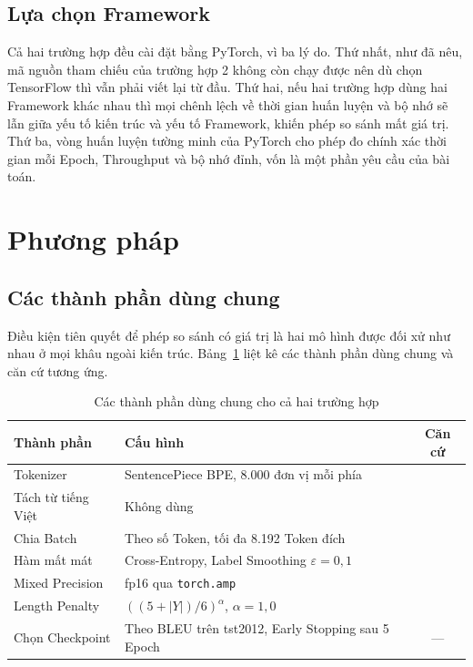 \documentclass[11pt,a4paper]{article}
\newcommand{\file}[1]{\texttt{\small #1}}
\begin{document}
\subsection{Lựa chọn Framework}

Cả hai trường hợp đều cài đặt bằng PyTorch, vì ba lý do. Thứ nhất, như đã nêu,
mã nguồn tham chiếu của trường hợp 2 không còn chạy được nên dù chọn TensorFlow
thì vẫn phải viết lại từ đầu. Thứ hai, nếu hai trường hợp dùng hai Framework
khác nhau thì mọi chênh lệch về thời gian huấn luyện và bộ nhớ sẽ lẫn giữa yếu
tố kiến trúc và yếu tố Framework, khiến phép so sánh mất giá trị. Thứ ba, vòng
huấn luyện tường minh của PyTorch cho phép đo chính xác thời gian mỗi Epoch,
Throughput và bộ nhớ đỉnh, vốn là một phần yêu cầu của bài toán.

\section{Phương pháp}
\label{sec:phuongphap}

\subsection{Các thành phần dùng chung}

Điều kiện tiên quyết để phép so sánh có giá trị là hai mô hình được đối xử như
nhau ở mọi khâu ngoài kiến trúc. Bảng~\ref{tab:shared} liệt kê các thành phần
dùng chung và căn cứ tương ứng.

\begin{table}[H]
\centering
\small
\caption{Các thành phần dùng chung cho cả hai trường hợp}
\label{tab:shared}
\begin{tabularx}{\textwidth}{lXc}
\toprule
\textbf{Thành phần} & \textbf{Cấu hình} & \textbf{Căn cứ} \\
\midrule
Tokenizer & SentencePiece BPE, 8.000 đơn vị mỗi phía & \cite{sennrich2016} \\
Tách từ tiếng Việt & Không dùng & \cite{phanvu2017,phanvu2019} \\
Chia Batch & Theo số Token, tối đa 8.192 Token đích & \cite{ott2018} \\
Hàm mất mát & Cross-Entropy, Label Smoothing $\varepsilon = 0{,}1$ & \cite{vaswani2017} \\
Mixed Precision & fp16 qua \file{torch.amp} & \cite{ott2018} \\
Length Penalty & $((5+|Y|)/6)^{\alpha}$, $\alpha = 1{,}0$ & \cite{wu2016} \\
Chọn Checkpoint & Theo BLEU trên tst2012, Early Stopping sau 5 Epoch & --- \\
\bottomrule
\end{tabularx}
\end{table}
\end{document}
